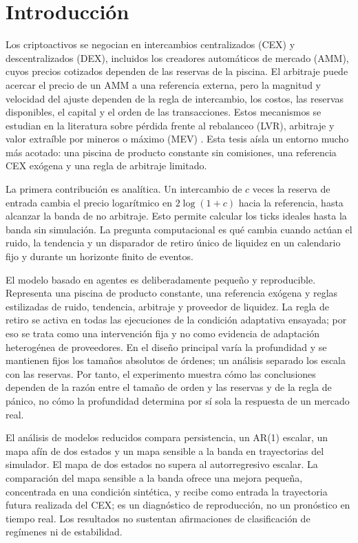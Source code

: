 \chapter{Introducción}
\label{cap:introduccion}

Los criptoactivos se negocian en intercambios centralizados (CEX) y descentralizados (DEX), incluidos los creadores automáticos de mercado (AMM), cuyos precios cotizados dependen de las reservas de la piscina. El arbitraje puede acercar el precio de un AMM a una referencia externa, pero la magnitud y velocidad del ajuste dependen de la regla de intercambio, los costos, las reservas disponibles, el capital y el orden de las transacciones. Estos mecanismos se estudian en la literatura sobre pérdida frente al rebalanceo (LVR), arbitraje y valor extraíble por mineros o máximo (MEV) \cite{milionis2022lvr,daian2020flash,zhou2021hft}. Esta tesis aísla un entorno mucho más acotado: una piscina de producto constante sin comisiones, una referencia CEX exógena y una regla de arbitraje limitado.

La primera contribución es analítica. Un intercambio de $c$ veces la reserva de entrada cambia el precio logarítmico en $2\log(1+c)$ hacia la referencia, hasta alcanzar la banda de no arbitraje. Esto permite calcular los ticks ideales hasta la banda sin simulación. La pregunta computacional es qué cambia cuando actúan el ruido, la tendencia y un disparador de retiro único de liquidez en un calendario fijo y durante un horizonte finito de eventos.

El modelo basado en agentes es deliberadamente pequeño y reproducible. Representa una piscina de producto constante, una referencia exógena y reglas estilizadas de ruido, tendencia, arbitraje y proveedor de liquidez. La regla de retiro se activa en todas las ejecuciones de la condición adaptativa ensayada; por eso se trata como una intervención fija y no como evidencia de adaptación heterogénea de proveedores. En el diseño principal varía la profundidad y se mantienen fijos los tamaños absolutos de órdenes; un análisis separado los escala con las reservas. Por tanto, el experimento muestra cómo las conclusiones dependen de la razón entre el tamaño de orden y las reservas y de la regla de pánico, no cómo la profundidad determina por sí sola la respuesta de un mercado real.

El análisis de modelos reducidos compara persistencia, un AR(1) escalar, un mapa afín de dos estados y un mapa sensible a la banda en trayectorias del simulador. El mapa de dos estados no supera al autorregresivo escalar. La comparación del mapa sensible a la banda ofrece una mejora pequeña, concentrada en una condición sintética, y recibe como entrada la trayectoria futura realizada del CEX; es un diagnóstico de reproducción, no un pronóstico en tiempo real. Los resultados no sustentan afirmaciones de clasificación de regímenes ni de estabilidad.

